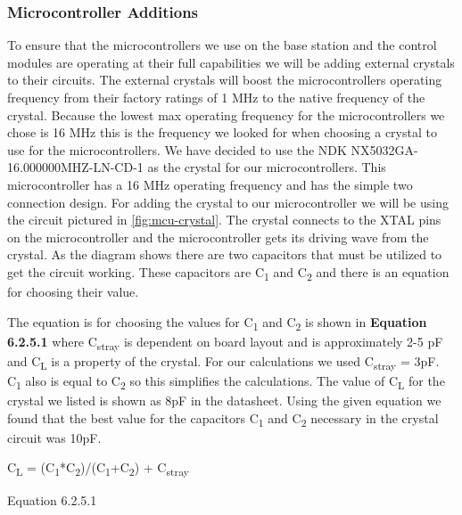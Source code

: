 \subsubsection{Microcontroller Additions}
To ensure that the microcontrollers we use on the base station and the control
modules are operating at their full capabilities we will be adding external
crystals to their circuits. The external crystals will boost the
microcontrollers operating frequency from their factory ratings of 1 MHz to the
native frequency of the crystal.  Because the lowest max operating frequency
for the microcontrollers we chose is 16 MHz this is the frequency we looked for
when choosing a crystal to use for the microcontrollers. We have decided to use
the NDK NX5032GA{}-16.000000MHZ{}-LN{}-CD{}-1 as the crystal for our
microcontrollers. This microcontroller has a 16 MHz operating frequency and has
the simple two connection design. For adding the crystal to our microcontroller
we will be using the circuit pictured in \autoref{fig:mcu-crystal}. The crystal
connects to the XTAL pins on the microcontroller and the microcontroller gets
its driving wave from the crystal. As the diagram shows there are two
capacitors that must be utilized to get the circuit working. These capacitors
are C\textsubscript{1} and C\textsubscript{2} and there is an equation for
choosing their value.


The equation is for choosing the values for C\textsubscript{1} and
C\textsubscript{2} is shown in \textbf{Equation 6.2.5.1 }where
C\textsubscript{stray} is dependent on board layout and is approximately 2-5 pF
and C\textsubscript{L} is a property of the crystal. For our calculations we
used C\textsubscript{stray} = 3pF. C\textsubscript{1 }also is equal to
C\textsubscript{2} so this simplifies the calculations. The value of
C\textsubscript{L} for the crystal we listed is shown as 8pF in the datasheet.
Using the given equation we found that the best value for the capacitors
C\textsubscript{1 }and C\textsubscript{2} necessary in the crystal circuit was
10pF.

{\centering\color{black}
C\textsubscript{L} = (C\textsubscript{1}*C\textsubscript{2})/(C\textsubscript{1}+C\textsubscript{2}) +
C\textsubscript{stray}
\par}

{\centering\color{black}
Equation 6.2.5.1
\par}


